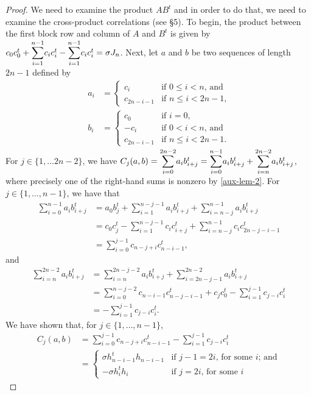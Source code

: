 \documentclass[../../../main]{subfiles}
\begin{document}
\begin{proof}
  We need to examine the product $AB^t$ and in order to do that, we need to examine the cross-product correlations (see \S5). To begin, the product between the first block row and column of $A$ and $B^t$ is given by $c_0c_0^t + \ssum_{i=1}^{n-1}c_ic_i^t - \ssum_{i=1}^{n-1}c_ic_i^t = \sigma J_n$. Next, let $a$ and $b$ be two sequences of length $2n-1$ defined by 
  \begin{align*}
  a_i&=\begin{cases}
        c_i & \text{if $0 \leq i < n$, and} \\
        c_{2n-i-1} & \text{if $n \leq i < 2n-1$,}
       \end{cases} \\
  b_i&=\begin{cases}
        c_0 & \text{if $i=0$,} \\
        -c_i & \text{if $0 < i < n$, and} \\
        c_{2n-i-1} & \text{if $n \leq i < 2n-1$.}
       \end{cases}
  \end{align*}
  For $j \in \{1, \dots 2n-2\}$, we have $C_j(a,b) = \ssum_{i=0}^{2n-2}a_ib_{i+j}^t = \ssum_{i=0}^{n-1}a_ib_{i+j}^t + \ssum_{i=n}^{2n-2}a_ib_{i+j}^t$, where precisely one of the right-hand sums is nonzero by \ref{aux-lem-2}. For $j \in \{1, \dots, n-1\}$, we have that
  \begin{align*}
   \sum_{i=0}^{n-1}a_ib_{i+j}^t &= a_0b_j^t + \sum_{i=1}^{n-j-1}a_ib_{i+j}^t + \sum_{i=n-j}^{n-1}a_ib_{i+j}^t \\
   &= c_0c_j^t - \sum_{i=1}^{n-j-1} c_ic_{i+j}^t + \sum_{i=n-j}^{n-1}c_ic_{2n-j-i-1}^t \\
   &= \sum_{i=0}^{j-1}c_{n-j+i}c_{n-i-1}^t,
  \end{align*}
  and
  \begin{align*}
   \sum_{i=n}^{2n-2}a_ib_{i+j}^t &= \sum_{i=n}^{2n-j-2}a_ib_{i+j}^t + \sum_{i=2n-j-1}^{2n-2}a_ib_{i+j}^t \\
   &= \sum_{i=0}^{n-j-2}c_{n-i-1}c_{n-j-i-1}^t + c_jc_0^t - \sum_{i=1}^{j-1}c_{j-i}c_i^t \\
   &= -\sum_{i=1}^{j-1}c_{j-i}c_i^t.
  \end{align*}
  We have shown that, for $j \in \{1,\dots,n-1\}$, 
  \begin{align*}
   C_j(a,b) &= \sum_{i=0}^{j-1}c_{n-j+i}c_{n-i-1}^t - \sum_{i=1}^{j-1}c_{j-i}c_i^t \\
   &= \begin{cases}
       \sigma h_{n-i-1}^th_{n-i-1} & \text{if $j-1=2i$, for some $i$; and} \\
       -\sigma h_i^th_i & \text{if $j=2i$, for some $i$}
      \end{cases}
  \end{align*}
  

\end{proof}
\end{document}

